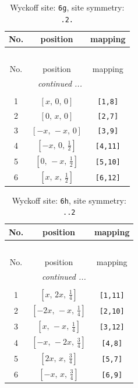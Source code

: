 \documentclass[fleqn,8pt]{jsarticle}
\begin{document}
\renewcommand{\arraystretch}{1.2}
\begin{longtable}{ccc}
\caption{Wyckoff site: {\tt 6g}, site symmetry: {\tt .2.}}
 \\
 \hline \hline
No. & position & mapping \\ \hline \endfirsthead

\multicolumn{2}{l}{\tablename\ \thetable{}} \\
 \hline \hline
No. & position & mapping \\ \hline \endhead

 \hline \hline
\multicolumn{2}{r}{\footnotesize\it continued ...} \\ \endfoot

 \hline \hline
\multicolumn{2}{r}{} \\ \endlastfoot

1 & $\left[ x,\, 0,\, 0 \right]$ & {\tt [1,8]} \\ \hline
2 & $\left[ 0,\, x,\, 0 \right]$ & {\tt [2,7]} \\ \hline
3 & $\left[ - x,\, - x,\, 0 \right]$ & {\tt [3,9]} \\ \hline
4 & $\left[ - x,\, 0,\, \frac{1}{2} \right]$ & {\tt [4,11]} \\ \hline
5 & $\left[ 0,\, - x,\, \frac{1}{2} \right]$ & {\tt [5,10]} \\ \hline
6 & $\left[ x,\, x,\, \frac{1}{2} \right]$ & {\tt [6,12]} \\
\end{longtable}
\renewcommand{\arraystretch}{1.2}
\begin{longtable}{ccc}
\caption{Wyckoff site: {\tt 6h}, site symmetry: {\tt ..2}}
 \\
 \hline \hline
No. & position & mapping \\ \hline \endfirsthead

\multicolumn{2}{l}{\tablename\ \thetable{}} \\
 \hline \hline
No. & position & mapping \\ \hline \endhead

 \hline \hline
\multicolumn{2}{r}{\footnotesize\it continued ...} \\ \endfoot

 \hline \hline
\multicolumn{2}{r}{} \\ \endlastfoot

1 & $\left[ x,\, 2 x,\, \frac{1}{4} \right]$ & {\tt [1,11]} \\ \hline
2 & $\left[ - 2 x,\, - x,\, \frac{1}{4} \right]$ & {\tt [2,10]} \\ \hline
3 & $\left[ x,\, - x,\, \frac{1}{4} \right]$ & {\tt [3,12]} \\ \hline
4 & $\left[ - x,\, - 2 x,\, \frac{3}{4} \right]$ & {\tt [4,8]} \\ \hline
5 & $\left[ 2 x,\, x,\, \frac{3}{4} \right]$ & {\tt [5,7]} \\ \hline
6 & $\left[ - x,\, x,\, \frac{3}{4} \right]$ & {\tt [6,9]} \\
\end{longtable}
\end{document}
